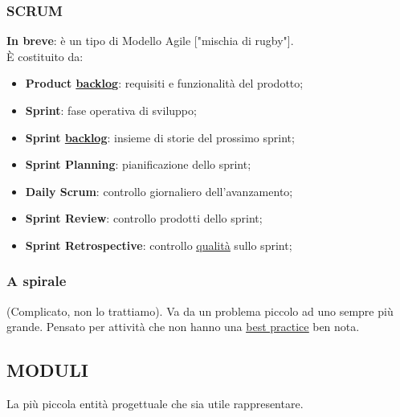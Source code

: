 			\subsubsection{SCRUM}		\label{scrum}
			\textbf{In breve}: è un tipo di Modello Agile ["mischia di rugby"]. \\
			È costituito da:
				\begin{itemize}
					\item \textbf{Product \underline{\hyperref[backlog]{backlog}}}: requisiti e funzionalità del prodotto;
					\item \textbf{Sprint}: fase operativa di sviluppo;
					\item \textbf{Sprint \underline{\hyperref[backlog]{backlog}}}: insieme di storie del prossimo sprint;
					\item \textbf{Sprint Planning}: pianificazione dello sprint;
					\item \textbf{Daily Scrum}: controllo giornaliero dell'avanzamento;
					\item \textbf{Sprint Review}: controllo prodotti dello sprint;
					\item \textbf{Sprint Retrospective}: controllo \underline{\hyperref[qualita]{qualità}} sullo sprint;
				\end{itemize}
			
			\subsubsection{A spirale} 
			(Complicato, non lo trattiamo). Va da un problema piccolo ad uno sempre più grande. Pensato per attività che non hanno una \underline{\hyperref[best]{best practice}} ben nota.
			
						
		\subsection{MODULI}		\label{moduli}
		La più piccola entità progettuale che sia utile rappresentare.	
	
	
